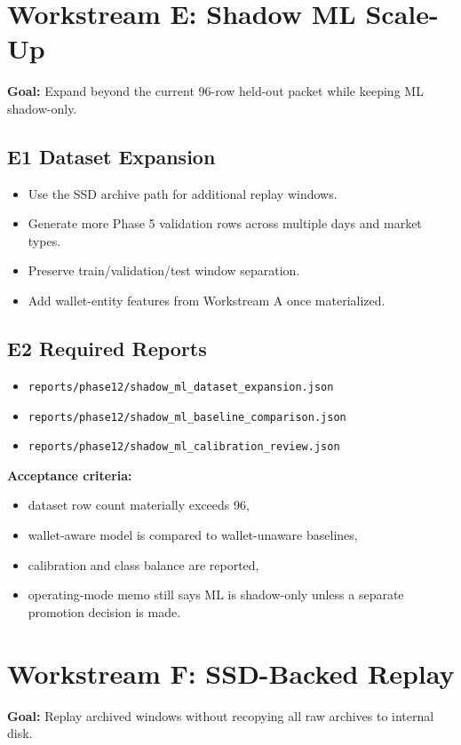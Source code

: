 \documentclass{article}
\begin{document}
\section*{Workstream E: Shadow ML Scale-Up}
\textbf{Goal:} Expand beyond the current 96-row held-out packet while keeping ML shadow-only.

\subsection*{E1 Dataset Expansion}
\begin{itemize}[nosep]
\item Use the SSD archive path for additional replay windows.
\item Generate more Phase 5 validation rows across multiple days and market types.
\item Preserve train/validation/test window separation.
\item Add wallet-entity features from Workstream A once materialized.
\end{itemize}

\subsection*{E2 Required Reports}
\begin{itemize}[nosep]
\item \texttt{reports/phase12/shadow\_ml\_dataset\_expansion.json}
\item \texttt{reports/phase12/shadow\_ml\_baseline\_comparison.json}
\item \texttt{reports/phase12/shadow\_ml\_calibration\_review.json}
\end{itemize}

\textbf{Acceptance criteria:}
\begin{itemize}[nosep]
\item dataset row count materially exceeds 96,
\item wallet-aware model is compared to wallet-unaware baselines,
\item calibration and class balance are reported,
\item operating-mode memo still says ML is shadow-only unless a separate promotion decision is made.
\end{itemize}

\section*{Workstream F: SSD-Backed Replay}
\textbf{Goal:} Replay archived windows without recopying all raw archives to internal disk.
\end{document}
